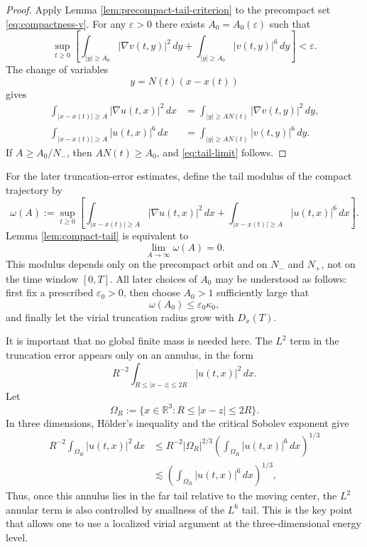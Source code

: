 \documentclass[10pt,a4paper]{amsart}
\numberwithin{equation}{section}
\newcommand{\R}{\mathbb R}
\newcommand{\eps}{\varepsilon}
\begin{document}
\begin{proof}
Apply Lemma \ref{lem:precompact-tail-criterion} to the precompact set \eqref{eq:compactness-v}. For any $\eps>0$ there exists $A_0=A_0(\eps)$ such that
\begin{equation*}
  \sup_{t\ge0}\left[
  \int_{|y|\ge A_0}|\nabla v(t,y)|^2\,dy
  +\int_{|y|\ge A_0}|v(t,y)|^6\,dy
  \right]<\eps.
\end{equation*}
The change of variables
\begin{equation*}
  y=N(t)(x-x(t))
\end{equation*}
gives
\begin{align*}
  \int_{|x-x(t)|\ge A}|\nabla u(t,x)|^2\,dx
  &=\int_{|y|\ge AN(t)}|\nabla v(t,y)|^2\,dy,\\
  \int_{|x-x(t)|\ge A}|u(t,x)|^6\,dx
  &=\int_{|y|\ge AN(t)}|v(t,y)|^6\,dy.
\end{align*}
If $A\ge A_0/N_-$, then $AN(t)\ge A_0$, and \eqref{eq:tail-limit} follows.
\end{proof}

For the later truncation-error estimates, define the tail modulus of the compact trajectory by
\begin{equation*}
  \omega(A):=\sup_{t\ge0}
  \left[
  \int_{|x-x(t)|\ge A}|\nabla u(t,x)|^2\,dx
  +\int_{|x-x(t)|\ge A}|u(t,x)|^6\,dx
  \right].
\end{equation*}
Lemma \ref{lem:compact-tail} is equivalent to
\begin{equation*}
  \lim_{A\to\infty}\omega(A)=0.
\end{equation*}
This modulus depends only on the precompact orbit and on $N_-$ and $N_+$, not on the time window $[0,T]$. All later choices of $A_0$ may be understood as follows: first fix a prescribed $\varepsilon_0>0$, then choose $A_0>1$ sufficiently large that
\begin{equation*}
  \omega(A_0)\le\varepsilon_0\kappa_0,
\end{equation*}
and finally let the virial truncation radius grow with $D_x(T)$.

It is important that no global finite mass is needed here. The $L^2$ term in the truncation error appears only on an annulus, in the form
\[
  R^{-2}\int_{R\le |x-z|\le 2R}|u(t,x)|^2\,dx.
\]
Let
\begin{equation*}
  \Omega_R:=\{x\in\R^3:R\le |x-z|\le2R\}.
\end{equation*}
In three dimensions, H\"older's inequality and the critical Sobolev exponent give
\[
\begin{aligned}
  R^{-2}\int_{\Omega_R}|u(t,x)|^2\,dx
  &\le R^{-2}|\Omega_R|^{2/3}
       \left(\int_{\Omega_R}|u(t,x)|^6\,dx\right)^{1/3}  \\
  &\lesssim \left(\int_{\Omega_R}|u(t,x)|^6\,dx\right)^{1/3},
\end{aligned}
\]
Thus, once this annulus lies in the far tail relative to the moving center, the $L^2$ annular term is also controlled by smallness of the $L^6$ tail. This is the key point that allows one to use a localized virial argument at the three-dimensional energy level.
\end{document}
